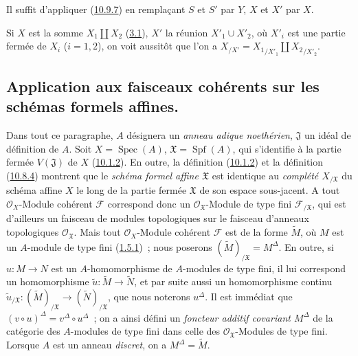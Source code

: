 Il suffit d'appliquer (\hyperref[I.10.9.7-fr]{10.9.7}) en remplaçant
$S$ et $S'$ par $Y$, $X$ et $X'$ par $X$.

\begin{remark}[10.9.10]
\label{I.10.9.10-fr}
Si $X$ est la somme $X_1\amalg X_2$
(\hyperref[subsection:I.3.1-fr]{3.1}), $X'$ la réunion
$X'_1\cup X'_2$, où $X'_i$ est une partie fermée de $X_i$ ($i=1,2$),
on voit aussitôt que l'on a
$X_{/X'}={X_1}_{/X'_1}\amalg {X_2}_{/X'_2}$.
\end{remark}

\subsection{Application aux faisceaux cohérents sur les schémas formels
affines.}
\label{subsection:I.10.10-fr}

\begin{env}[10.10.1]
\label{I.10.10.1-fr}
Dans tout ce paragraphe, $A$ désignera un \emph{anneau adique
noethérien}, $\mathfrak{J}$ un idéal de définition de $A$. Soit
$X=\operatorname{Spec}(A)$, $\mathfrak{X}=\operatorname{Spf}(A)$, qui
s'identifie à la partie fermée $V(\mathfrak{J})$ de $X$
(\hyperref[I.10.1.2-fr]{10.1.2}). En outre, la définition
(\hyperref[I.10.1.2-fr]{10.1.2}) et la définition
(\hyperref[I.10.8.4-fr]{10.8.4}) montrent que le
\emph{schéma formel affine $\mathfrak{X}$} est identique au
\emph{complété $X_{/\mathfrak{X}}$} du schéma affine $X$ le long de la
partie fermée $\mathfrak{X}$ de son espace sous-jacent. A tout
$\mathscr{O}_X$-Module cohérent $\mathscr{F}$ correspond donc un
$\mathscr{O}_{\mathfrak{X}}$-Module de type fini
$\mathscr{F}_{/\mathfrak{X}}$, qui est d'ailleurs un faisceau de modules
topologiques sur le faisceau d'anneaux topologiques
$\mathscr{O}_{\mathfrak{X}}$. Mais tout $\mathscr{O}_X$-Module cohérent
$\mathscr{F}$ est de la forme $\widetilde M$, où $M$ est un $A$-module
de type fini (\hyperref[I.1.5.1-fr]{1.5.1})~; nous poserons
$(\widetilde M)_{/\mathfrak{X}}=M^\Delta$. En outre, si $u:M\to N$ est
un $A$-homomorphisme de $A$-modules de type fini, il lui correspond un
homomorphisme $\widetilde u:\widetilde M\to\widetilde N$, et par suite
aussi un homomorphisme continu
$\widetilde u_{/\mathfrak{X}}:(\widetilde M)_{/\mathfrak{X}}\to
(\widetilde N)_{/\mathfrak{X}}$, que nous noterons $u^\Delta$. Il est
immédiat que
$(v\circ u)^\Delta=v^\Delta\circ u^\Delta$~; on a ainsi défini un
\emph{foncteur additif covariant $M^\Delta$} de la catégorie des
$A$-modules de type fini dans celle des
$\mathscr{O}_{\mathfrak{X}}$-Modules de type fini. Lorsque $A$ est un
anneau \emph{discret}, on a $M^\Delta=\widetilde M$.
\end{env}

